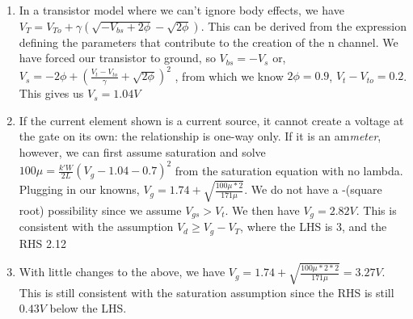 \documentclass{article}
\begin{document}
\begin{prob}
	\begin{enumerate}
	\item In a transistor model where we can't ignore body effects, we have $V_T=V_{To}+\gamma(\sqrt{-V_{bs}+2\phi}-\sqrt{2\phi})$.
	This can be derived from the expression defining the parameters that contribute to the creation of the n channel.
	We have forced our transistor to ground, so $V_{bs}=-V_s$ or, $V_s=-2\phi + (\frac{V_t-V_{to}}{\gamma}+\sqrt{2\phi})^2$
	, from which we know $2\phi=0.9$, $V_t-V_{to}=0.2$.
	This gives us $V_s = 1.04V$

\item If the current element shown is a current source, it cannot create a voltage at the gate on its own: the relationship is one-way only.
	If it is an am\emph{meter}, however, we can first assume saturation and solve $100\mu=\frac{k'W}{2L}(V_g-1.04-0.7)^2$ from the saturation equation with no lambda.
	Plugging in our knowns, $V_g = 1.74+\sqrt{\frac{100\mu *2}{171\mu}}$. We do not have a -(square root) possibility since we assume $V_{gs}>V_t$.
	We then have $V_g = 2.82V$. This is consistent with the assumption $V_d \geq V_g-V_T$, where the LHS is 3, and the RHS 2.12
\item With little changes to the above, we have $V_g=1.74+\sqrt{\frac{100\mu*2*2}{171\mu}} = 3.27V$.
	This is still consistent with the saturation assumption since the RHS is still  $0.43V$ below the LHS.
	\end{enumerate}
\end{prob}
\end{document}
